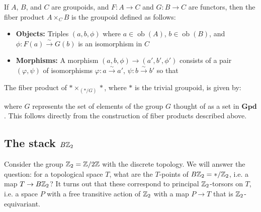 \documentclass[12pt]{article}
\DeclareMathOperator{\ob}{ob}
\begin{document}
\begin{definition}
    If $A$, $B$, and $C$ are groupoids, and $F : A \rightarrow C$ and $G : B \rightarrow C$ are functors, then the fiber product $A \times_C B$ is the groupoid defined as follows:

    \begin{itemize}
        \item \textbf{Objects:} Triples $(a, b, \phi)$ where $a \in \ob(A)$, $b \in \ob(B)$, and $\phi : F(a) \stackrel{\sim}{\rightarrow} G(b)$ is an isomorphism in $C$

        \item \textbf{Morphisms:} A morphism $(a, b, \phi) \rightarrow (a', b', \phi')$ consists of a pair $(\varphi, \psi)$ of isomorphisms $\varphi : a \stackrel{\sim}{\rightarrow} a'$, $\psi : b \stackrel{\sim}{\rightarrow} b'$ so that
              \begin{center}
              \end{center}
    \end{itemize}
\end{definition}

\begin{example}
    The fiber product of $* \times_{(*/G)} *$, where $*$ is the trivial groupoid, is given by:
    \begin{center}
    \end{center}
    where $G$ represents the set of elements of the group $G$ thought of as a set in $\textbf{Gpd}$. This follows directly from the construction of fiber products described above.
\end{example}



\subsection{The stack $B\mathbb{Z}_2$}
Consider the group $\mathbb{Z}_2 = \mathbb{Z}/2\mathbb{Z}$ with the discrete topology. We will answer the question: for a topological space $T$, what are the $T$-points of $B\mathbb{Z}_2 = */\mathbb{Z}_2$, i.e. a map $T \to B\mathbb{Z}_2$? It turns out that these correspond to principal $\mathbb{Z}_2$-torsors on $T$, i.e. a space $P$ with a free transitive action of $\mathbb{Z}_2$ with a map $P \to T$ that is $\mathbb{Z}_2$-equivariant.
\end{document}
